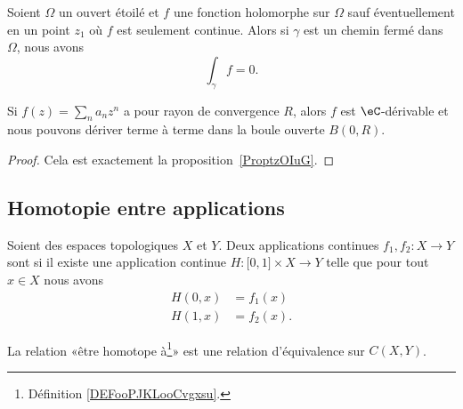 \begin{proposition}   \label{PrpopwQSbJg}
	Soient \( \Omega\) un ouvert étoilé et \( f\) une fonction holomorphe sur \( \Omega\) sauf éventuellement en un point \( z_1\) où \( f\) est seulement continue. Alors si \( \gamma\) est un chemin fermé dans \( \Omega\), nous avons
	\begin{equation}
		\int_{\gamma}f=0.
	\end{equation}
\end{proposition}

\begin{proposition}     \label{PropRZCKeO}
	Si \( f(z)=\sum_na_nz^n\) a pour rayon de convergence \( R\), alors \( f\) est \( \eC\)-dérivable et nous pouvons dériver terme à terme dans la boule ouverte \( B(0,R)\).
\end{proposition}

\begin{proof}
	Cela est exactement la proposition~\ref{ProptzOIuG}.
\end{proof}

\subsection{Homotopie entre applications}

\begin{definition}       \label{DEFooPJKLooCvgxsu}
    Soient des espaces topologiques \( X\) et \( Y\). Deux applications continues \( f_1,f_2\colon X\to Y\) sont  si il existe une application continue \( H\colon \mathopen[ 0 , 1 \mathclose]\times X\to Y \) telle que pour tout \( x\in X \) nous avons
    \begin{subequations}
        \begin{align}
            H(0,x)&=f_1(x)\\
            H(1,x)&=f_2(x).
        \end{align}
    \end{subequations}
\end{definition}

\begin{lemma}       \label{LEMooMGFZooGOaGYl}
    La relation «être homotope à\footnote{Définition \ref{DEFooPJKLooCvgxsu}.}»  est une relation d'équivalence sur \( C(X,Y)\).
\end{lemma}

